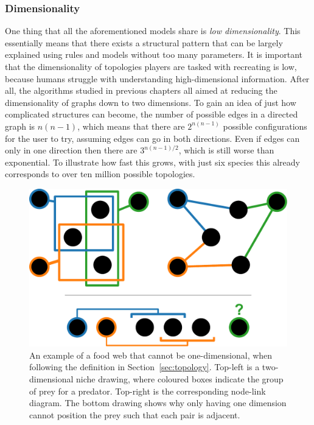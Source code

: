 \subsubsection{Dimensionality}
One thing that all the aforementioned models share is \emph{low dimensionality}. This essentially means that there exists a structural pattern that can be largely explained using rules and models without too many parameters.
It is important that the dimensionality of topologies players are tasked with recreating is low, because humans struggle with understanding high-dimensional information. After all, the algorithms studied in previous chapters all aimed at reducing the dimensionality of graphs down to two dimensions. To gain an idea of just how complicated structures can become, the number of possible edges in a directed graph is $n(n-1)$, which means that there are $2^{n(n-1)}$ possible configurations for the user to try, assuming edges can go in both directions. Even if edges can only in one direction then there are $3^{n(n-1)/2}$, which is still worse than exponential. To illustrate how fast this grows, with just six species this already corresponds to over ten million possible topologies.

\begin{figure}
  \centering
  \includegraphics[width=.9\textwidth]{joy/niche.pdf}
  \caption[An illustration of food web dimensionality]{An example of a food web that cannot be one-dimensional, when following the definition in Section~\ref{sec:topology}. Top-left is a two-dimensional niche drawing, where coloured boxes indicate the group of prey for a predator. Top-right is the corresponding node-link diagram.
  The bottom drawing shows why only having one dimension cannot position the prey such that each pair is adjacent.}
  \label{fig:niche}
\end{figure}

